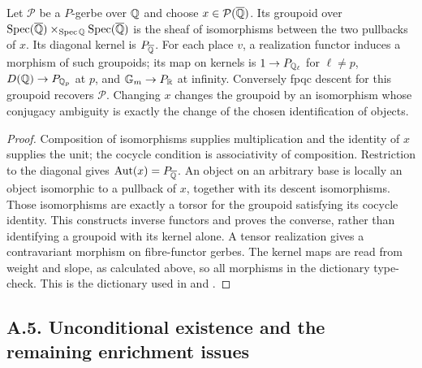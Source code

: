 \begin{proposition}
\label{A:dictionary}
Let $\mathscr P$ be a $P$-gerbe over $\mathbb Q$ and choose
$x\in\mathcal{P}(\overline{\mathbb Q})$. Its groupoid over
$\operatorname{Spec}(\overline{\mathbb Q})\times_{\operatorname{Spec}\mathbb Q}\operatorname{Spec}(\overline{\mathbb Q})$
is the sheaf of isomorphisms between the two pullbacks of $x$.
Its diagonal kernel is $P_{\overline{\mathbb Q}}$. For each place $v$,
a realization functor induces a morphism of such groupoids;
its map on kernels is $1\to P_{\mathbb Q_\ell}$ for $\ell\ne p$,
$D(\mathbb Q)\to P_{\mathbb Q_p}$ at $p$, and ${\mathbb G_m}\to P_\mathbb R$ at infinity.
Conversely fpqc descent for this groupoid recovers $\mathscr P$.
Changing $x$ changes the groupoid by an isomorphism whose
conjugacy ambiguity is exactly the change of the chosen
identification of objects.
\end{proposition}
\begin{proof}
Composition of isomorphisms supplies multiplication and the
identity of $x$ supplies the unit; the cocycle condition is
associativity of composition. Restriction to the diagonal gives
$\operatorname{Aut}(x)=P_{\overline{\mathbb Q}}$. An object on an arbitrary base is
locally an object isomorphic to a pullback of $x$, together with
its descent isomorphisms. Those isomorphisms are exactly a torsor
for the groupoid satisfying its cocycle identity. This constructs
inverse functors and proves the converse, rather than identifying
a groupoid with its kernel alone. A tensor realization gives a
contravariant morphism on fibre-functor gerbes. The kernel maps
are read from weight and slope, as calculated above, so all
morphisms in the dictionary type-check. This is the dictionary
used in \citet[\S3, Examples 3.26--3.28]{AMilne1994} and
\citet[\S6]{AMilne2003}.
\end{proof}

\subsection{A.5. Unconditional existence and the remaining enrichment issues}

